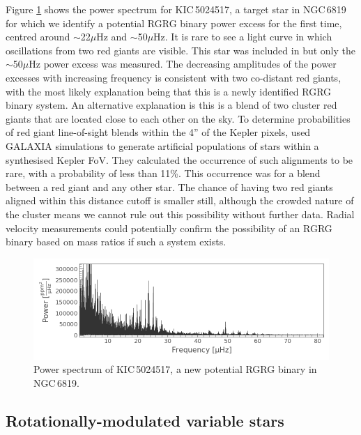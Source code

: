 Figure \ref{fig:5024517_ps} shows the power spectrum for KIC\,5024517, a \Kepler{} target star in NGC\,6819 for which we identify a potential RG\textendash{}RG binary power excess for the first time, centred around $\sim$22$\mu$Hz and $\sim$50$\mu$Hz. It is rare to see a light curve in which oscillations from two red giants are visible. This star was included in \citet{bellamy_using_2015} but only the $\sim$50$\mu$Hz power excess was measured. The decreasing amplitudes of the power excesses with increasing frequency is consistent with two co-distant red giants, with the most likely explanation being that this is a newly identified RG\textendash{}RG binary system. An alternative explanation is this is a blend of two cluster red giants that are located close to each other on the sky. To determine probabilities of red giant line-of-sight blends within the 4” of the Kepler pixels, \citet{colman_pixels_2020} used GALAXIA simulations \citep{sharma_galaxia_2011} to generate artificial populations of stars within a synthesised Kepler FoV. They calculated the occurrence of such alignments to be rare, with a probability of less than 11\%. This occurrence was for a blend between a red giant and any other star. The chance of having two red giants aligned within this distance cutoff is smaller still, although the crowded nature of the cluster means we cannot rule out this possibility without further data. Radial velocity measurements could potentially confirm the possibility of an RG\textendash{}RG binary based on mass ratios if such a system exists.

\begin{figure}
    \centering
    \includegraphics[width=\linewidth]{Chapter5/5024517_ps.png}
    \caption[Power spectrum of the new potential RG\textendash{}RG binary, KIC\,5024517]{Power spectrum of KIC\,5024517, a new potential RG\textendash{}RG binary in NGC\,6819.}
    \label{fig:5024517_ps}
\end{figure}

\subsection{Rotationally-modulated variable stars}


